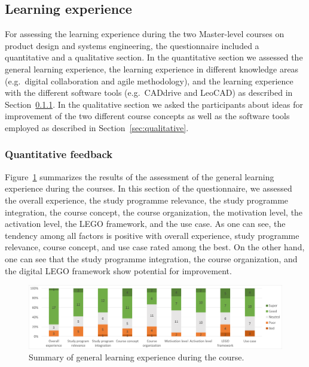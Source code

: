 \documentclass{PDS}
\begin{document}
\subsection{Learning experience}
\label{sec:learning}

For assessing the learning experience during the two Master-level courses on product design and systems engineering, the questionnaire included a quantitative and a qualitative section.
In the quantitative section we assessed the general learning experience, the learning experience in different knowledge areas (e.g.\ digital collaboration and agile methodology), and the learning experience with the different software tools (e.g.\ CADdrive and LeoCAD) as described in Section~\ref{sec:quantitative}.
In the qualitative section we asked the participants about ideas for improvement of the two different course concepts as well as the software tools employed as described in Section~\ref{sec:qualitative}.

\subsubsection{Quantitative feedback}
\label{sec:quantitative}

Figure~\ref{fig:after-general} summarizes the results of the assessment of the general learning experience during the courses.
In this section of the questionnaire, we assessed the overall experience, the study programme relevance, the study programme integration, the course concept, the course organization, the motivation level, the activation level, the LEGO framework, and the use case.
As one can see, the tendency among all factors is positive with overall experience, study programme relevance, course concept, and use case rated among the best.
On the other hand, one can see that the study programme integration, the course organization, and the digital LEGO framework show potential for improvement.

\begin{figure}[htbp]
    \centering
    \includegraphics[width=\textwidth]{./diagrams/after-general.png}
    \caption{Summary of general learning experience during the course.}
    \label{fig:after-general}
\end{figure}
\end{document}
